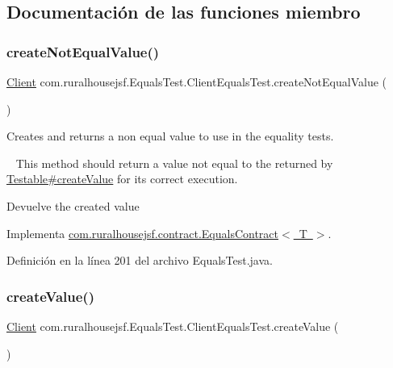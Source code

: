 \subsection{Documentación de las funciones miembro}
\mbox{\label{a00252_a25218bb97f8e3d88b9dd7e13afd0a6ed}} 
\subsubsection{\texorpdfstring{createNotEqualValue()}{createNotEqualValue()}}
{\footnotesize\ttfamily \mbox{\hyperlink{a00164}{Client}} com.\+ruralhousejsf.\+Equals\+Test.\+Client\+Equals\+Test.\+create\+Not\+Equal\+Value (\begin{DoxyParamCaption}{ }\end{DoxyParamCaption})}



Creates and returns a non equal value to use in the equality tests. 

~\newline
 This method should return a value not equal to the returned by \mbox{\hyperlink{}{Testable\#create\+Value}} for its correct execution.

\begin{DoxyReturn}{Devuelve}
the created value 
\end{DoxyReturn}


Implementa \mbox{\hyperlink{a00240_a65840509b57f6b89e42e2abf1978aa01}{com.\+ruralhousejsf.\+contract.\+Equals\+Contract$<$ T $>$}}.



Definición en la línea 201 del archivo Equals\+Test.\+java.

\mbox{\label{a00252_aa74f54ea042862db1a5499d31ec75539}} 
\subsubsection{\texorpdfstring{createValue()}{createValue()}}
{\footnotesize\ttfamily \mbox{\hyperlink{a00164}{Client}} com.\+ruralhousejsf.\+Equals\+Test.\+Client\+Equals\+Test.\+create\+Value (\begin{DoxyParamCaption}{ }\end{DoxyParamCaption})}



